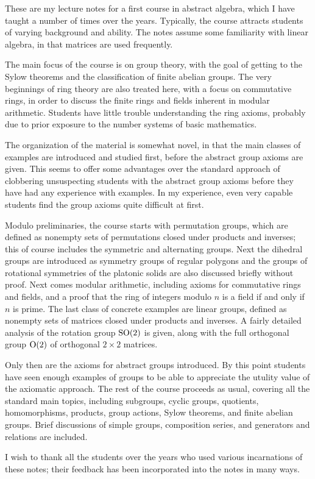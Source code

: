 These are my lecture notes for a first course in abstract algebra, which I have taught a number of times over the years. Typically, the course attracts students of varying background and ability. The notes assume some familiarity with linear algebra, in that matrices are used frequently.

The main focus of the course is on group theory, with the goal of getting to the Sylow theorems and the classification of finite abelian groups. The very beginnings of ring theory are also treated here, with a focus on commutative rings, in order to discuss the finite rings and fields inherent in modular arithmetic. Students have little trouble understanding the ring axioms, probably due to prior exposure to the number systems of basic mathematics. 

The organization of the material is somewhat novel, in that the main classes of examples are introduced and studied first, before the abstract group axioms are given. This seems to offer some advantages over the standard approach of clobbering unsuspecting students with the abstract group axioms before they have had any experience with examples. In my experience, even very capable students find the group axioms quite difficult at first.

Modulo preliminaries, the course starts with permutation groups, which are defined as nonempty sets of permutations closed under products and inverses; this of course includes the symmetric and alternating groups. Next the dihedral groups are introduced as symmetry groups of regular polygons and the groups of rotational symmetries of the platonic solids are also discussed briefly without proof. Next comes modular arithmetic, including axioms for commutative rings and fields, and a proof that the ring of integers modulo $n$ is a field if and only if $n$ is prime. The last class of concrete examples are linear groups, defined as nonempty sets of matrices closed under products and inverses. A fairly detailed analysis of the rotation group $\mathrm{SO}(2)$ is given, along with the full orthogonal group $\mathrm{O}(2)$ of orthogonal $2 \times 2$ matrices. 

Only then are the axioms for abstract groups introduced. By this point students have seen enough examples of groups to be able to appreciate the utulity value of the axiomatic approach. The rest of the course proceeds as usual, covering all the standard main topics, including subgroups, cyclic groups, quotients, homomorphisms, products, group actions, Sylow theorems, and finite abelian groups. Brief discussions of simple groups, composition series, and generators and relations are included.

I wish to thank all the students over the years who used various incarnations of these notes; their feedback has been incorporated into the notes in many ways.


